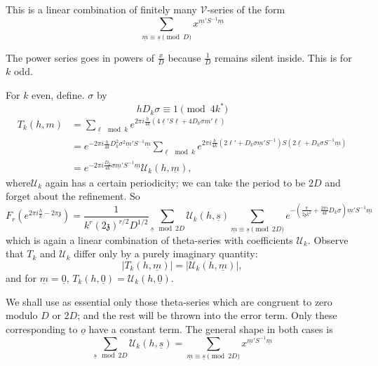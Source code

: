 This is a linear combination of finitely many $\mathscr{V}$-series of
the form 
$$
\sum_{\underline{m}\equiv \underline{s} \pmod{D}}
x^{\underline{m}'S^{-1} \underline{m}}
$$

The power series goes in powers of $\frac{x}{D}$ because $\frac{1}{D}$
remains silent inside. This is for $k$ odd.

For $k$ even, define. $\sigma$ by 
$$
h D_k \sigma \equiv 1 \pmod{4k^*}
$$
\begin{align*}
  T_k (h, m)& = \sum_{\underline{\ell} \mod k}e^{2 \pi i \frac{h}{4k}
    (4 \underline{\ell}' S \underline{\ell}+ 4 D_k \sigma
    \underline{m}' \underline{\ell})}\\
  & = e^{-2 \pi i \frac{h}{4k} D^2_k \sigma^2 \underline{m}'
    S^{-1}\underline{m}} \sum_{\underline{\ell} \mod k} e^{2 \pi i
    \frac{h}{4k} (2 \ell' + D_k \sigma \underline{m}' S^{-1})S (2
    \underline{\ell} + D_k \sigma S^{-1} \underline{m})}\\
  & = e^{- 2 \pi i \frac{D_k}{4k}\sigma \underline{m}' S^{-1}
    \underline{m}} \mathscr{U}_k (h, \underline{m}),
\end{align*}
where\pageoriginale $\mathscr{U}_k$ again has a certain periodicity; we can take the
period to be $2D$ and forget about the refinement. So
$$
F_r \left(e^{2\pi i \frac{h}{k} - 2 \pi \mathfrak{z}}\right) =
\frac{1}{k^r (2 \mathfrak{z})^{r/2} D^{1/2}} \sum_{\underline{s} \mod
  2D} \mathscr{U}_k (h, \underline{s}) \sum_{\underline{m} \equiv
  \underline{s} \pmod{2D}} e^{- \left(\frac{\pi}{2 \mathfrak{z} k^2} +
  \frac{2 \pi i}{4k} D_k \sigma\right) \underline{m}' S^{-1} \underline{m}} 
$$
which is again a linear combination of theta-series with coefficients
$\mathscr{U}_k$. Observe that $T_k$ and $\mathscr{U}_k$ differ only by
a purely imaginary quantity:
$$
|T_k (h, \underline{m})| = |\mathscr{U}_k (h, \underline{m})|,
$$ 
and for $\underline{m}=\underline{0}$, $T_k (h, \underline{0}) =
\mathscr{U}_k (h, \underline{0})$.

We shall use as essential only those theta-series which are congruent
to zero modulo $D$ or $2D$; and the rest will be thrown into the error
term. Only these corresponding to $\underline{o}$ have a constant
term. The general shape in both cases is 
$$
\sum_{\underline{s} \mod 2D} \mathscr{U}_k (h, \underline{s})=
\sum_{\underline{m}\equiv \underline{s}\pmod{2D}} x^{\underline{m}'
  S^{-1} \underline{m}} 
$$
